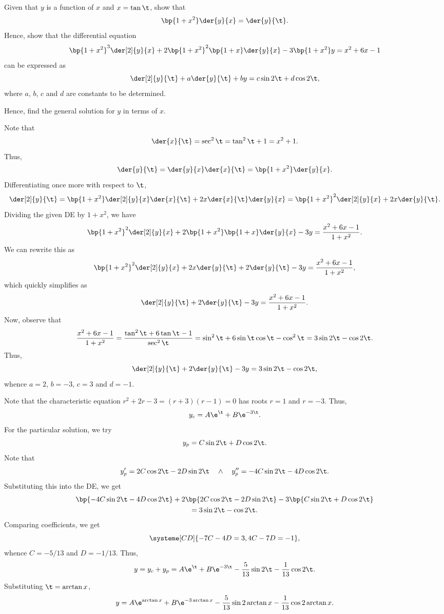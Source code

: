 \begin{problem}
    Given that $y$ is a function of $x$ and $x = \tan \t$, show that \[\bp{1 + x^2} \der{y}{x} = \der{y}{\t}.\] Hence, show that the differential equation \[\bp{1 + x^2}^3 \der[2]{y}{x} + 2\bp{1 + x^2}^2 \bp{1 + x} \der{y}{x} - 3\bp{1 + x^2} y = x^2 + 6x - 1\] can be expressed as \[\der[2]{y}{\t} + a \der{y}{\t} + by = c \sin 2\t + d \cos 2\t,\] where $a$, $b$, $c$ and $d$ are constants to be determined.

    Hence, find the general solution for $y$ in terms of $x$.
\end{problem}
\begin{solution}
    Note that \[\der{x}{\t} = \sec^2 \t = \tan^2 \t + 1 = x^2 + 1.\] Thus, \[\der{y}{\t} = \der{y}{x} \der{x}{\t} = \bp{1 + x^2} \der{y}{x}.\] Differentiating once more with respect to $\t$, \[\der[2]{y}{\t} = \bp{1 + x^2} \der[2]{y}{x} \der{x}{\t} + 2x \der{x}{\t} \der{y}{x} = \bp{1 + x^2}^2 \der[2]{y}{x} + 2x \der{y}{\t}.\] Dividing the given DE by $1 + x^2$, we have \[\bp{1 + x^2}^2 \der[2]{y}{x} + 2\bp{1 + x^2} \bp{1 + x} \der{y}{x} - 3 y = \frac{x^2 + 6x - 1}{1 + x^2}.\] We can rewrite this as \[\bp{1 + x^2}^2 \der[2]{y}{x} + 2x\der{y}{\t} + 2\der{y}{\t} - 3 y = \frac{x^2 + 6x - 1}{1 + x^2},\] which quickly simplifies as \[\der[2]{y}{\t} + 2 \der{y}{\t} - 3y =  \frac{x^2 + 6x - 1}{1 + x^2}.\] Now, observe that \[\frac{x^2 + 6x - 1}{1 + x^2} = \frac{\tan^2 \t + 6\tan \t - 1}{\sec^2 \t} = \sin^2 \t + 6\sin\t\cos\t - \cos^2\t = 3\sin2\t - \cos2\t.\] Thus, \[\der[2]{y}{\t} + 2 \der{y}{\t} - 3y = 3\sin2\t - \cos2\t,\] whence $a = 2$, $b = -3$, $c = 3$ and $d = -1$.
	
	Note that the characteristic equation $r^2 + 2r - 3 = (r+3)(r-1) = 0$ has roots $r = 1$ and $r = -3$. Thus, \[y_c = A\e^{\t} + B\e^{-3\t}.\] For the particular solution, we try \[y_p = C\sin 2\t + D \cos 2\t.\] Note that \[y_p' = 2C \cos 2\t - 2D \sin 2\t \quad \land \quad y_p'' = -4C \sin 2\t - 4D \cos 2\t.\] Substituting this into the DE, we get
    \begin{gather*}
        \bp{-4C \sin 2\t - 4D \cos 2\t} + 2\bp{2C \cos 2\t - 2D \sin 2\t} - 3\bp{C\sin 2\t + D \cos 2\t}\\
        = 3\sin 2\t - \cos 2\t.
    \end{gather*}
    Comparing coefficients, we get \[\systeme[CD]{-7C-4D = 3,4C-7D=-1},\] whence $C = -5/13$ and $D = -1/13$. Thus, \[y = y_c + y_p =  A\e^{\t} + B\e^{-3\t} - \frac5{13} \sin 2\t - \frac1{13} \cos 2\t.\] Substituting $\t = \arctan x$, \[y = A\e^{\arctan x} + B\e^{-3\arctan x} - \frac5{13} \sin{2\arctan x} - \frac1{13} \cos{2\arctan x}.\]
\end{solution}

